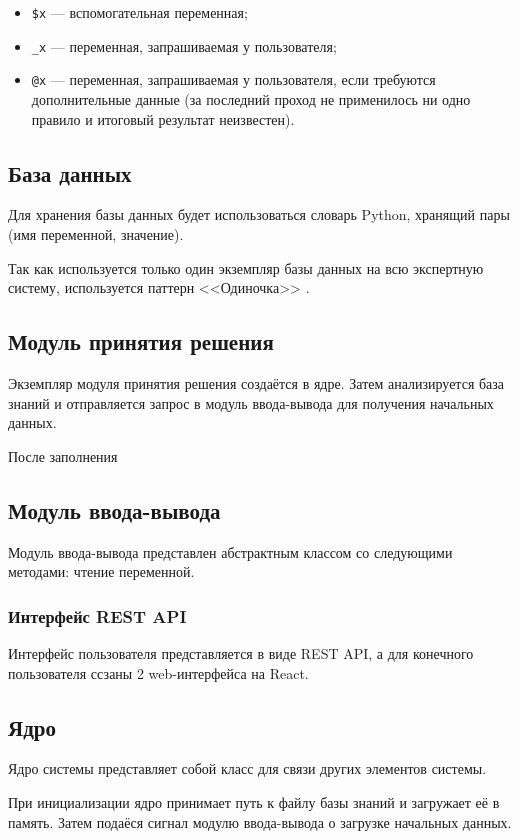 \begin{itemize}
	\item \texttt{\$x} --- вспомогательная переменная;
	\item \texttt{\_x} --- переменная, запрашиваемая у пользователя;
	\item \texttt{@x} --- переменная, запрашиваемая у пользователя, если требуются дополнительные данные (за последний проход не применилось ни одно правило и итоговый результат неизвестен).
\end{itemize}

\subsection{База данных}

Для хранения базы данных будет использоваться словарь Python, хранящий пары (имя переменной, значение).

Так как используется только один экземпляр базы данных на всю экспертную систему, используется паттерн <<Одиночка>> \cite{gammaDesignPatternsElements1995}.

\subsection{Модуль принятия решения}

Экземпляр модуля принятия решения создаётся в ядре.
Затем анализируется база знаний и отправляется запрос в модуль ввода-вывода для получения начальных данных.

После заполнения

\subsection{Модуль ввода-вывода}

Модуль ввода-вывода представлен абстрактным классом со следующими методами: чтение переменной.

\subsubsection{Интерфейс REST API}

Интерфейс пользователя представляется в виде REST API, а для конечного пользователя ссзаны 2 web-интерфейса на React.

\subsection{Ядро}

Ядро системы представляет собой класс для связи других элементов системы.

При инициализации ядро принимает путь к файлу базы знаний и загружает её в память.
Затем подаёся сигнал модулю ввода-вывода о загрузке начальных данных.
